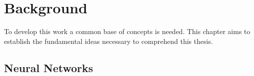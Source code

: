 \chapter{Background}
\label{ch:background}

To develop this work a common base of concepts is needed. This chapter aims to establish the fundamental ideas necessary to comprehend this thesis.\\

\section{Neural Networks}
